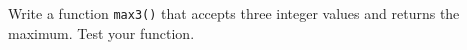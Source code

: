 Write a function \texttt{max3()} that accepts three integer values and returns the maximum. Test your function.

